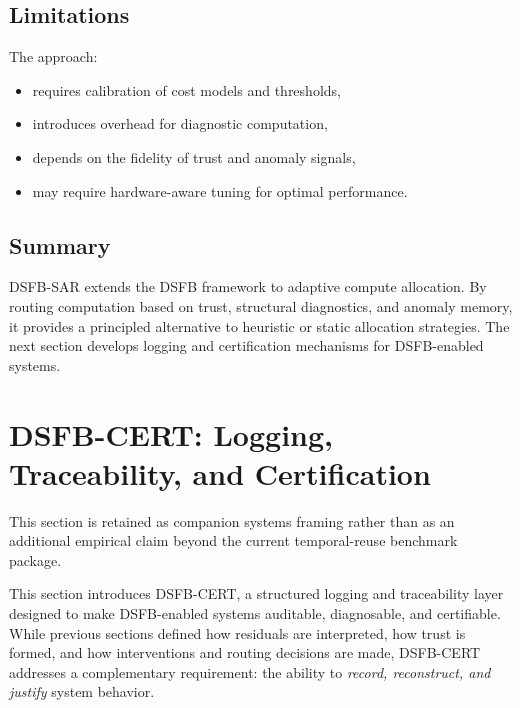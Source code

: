 \documentclass[11pt]{article}
\theoremstyle{definition}
\theoremstyle{plain}
\begin{document}

\subsection{Limitations}

The approach:
\begin{itemize}[leftmargin=1.5em]
    \item requires calibration of cost models and thresholds,
    \item introduces overhead for diagnostic computation,
    \item depends on the fidelity of trust and anomaly signals,
    \item may require hardware-aware tuning for optimal performance.
\end{itemize}


\subsection{Summary}

DSFB-SAR extends the DSFB framework to adaptive compute allocation. By routing computation based on trust, structural diagnostics, and anomaly memory, it provides a principled alternative to heuristic or static allocation strategies. The next section develops logging and certification mechanisms for DSFB-enabled systems.


\section{DSFB-CERT: Logging, Traceability, and Certification}

This section is retained as companion systems framing rather than as an additional empirical claim beyond the current temporal-reuse benchmark package.
\label{sec:cert}

This section introduces DSFB-CERT, a structured logging and traceability layer designed to make DSFB-enabled systems auditable, diagnosable, and certifiable. While previous sections defined how residuals are interpreted, how trust is formed, and how interventions and routing decisions are made, DSFB-CERT addresses a complementary requirement: the ability to \emph{record, reconstruct, and justify} system behavior.
\end{document}
